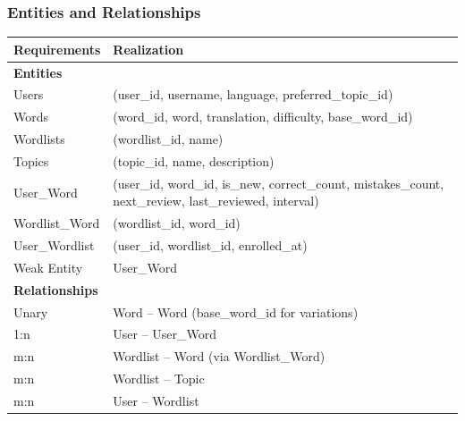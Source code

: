 \documentclass[a4paper, 11pt]{article}
\begin{document}
\subsubsection{Entities and Relationships}
\begin{table}[H]
\begin{tabular}{|l|l|}
\hline
\rowcolor[HTML]{93C47D}  
\textbf{Requirements} & \textbf{Realization} \\ \hline

\rowcolor[HTML]{D9D9D9}
\textbf{Entities} & \\ \hline

\cellcolor[HTML]{D9D9D9} Users & (user\_id, username, language, preferred\_topic\_id) \\ \hline
\cellcolor[HTML]{D9D9D9} Words & (word\_id, word, translation, difficulty, base\_word\_id) \\ \hline
\cellcolor[HTML]{D9D9D9} Wordlists & (wordlist\_id, name) \\ \hline
\cellcolor[HTML]{D9D9D9} Topics & (topic\_id, name, description) \\ \hline
\cellcolor[HTML]{D9D9D9} User\_Word & (user\_id, word\_id, is\_new, correct\_count, mistakes\_count, next\_review, last\_reviewed, interval) \\ \hline
\cellcolor[HTML]{D9D9D9} Wordlist\_Word & (wordlist\_id, word\_id) \\ \hline
\cellcolor[HTML]{D9D9D9} User\_Wordlist & (user\_id, wordlist\_id, enrolled\_at) \\ \hline
\cellcolor[HTML]{D9D9D9} Weak Entity & User\_Word \\ \hline

\rowcolor[HTML]{D9D9D9}
\textbf{Relationships} & \\ \hline

\cellcolor[HTML]{D9D9D9} Unary & Word -- Word (base\_word\_id for variations) \\ \hline
\cellcolor[HTML]{D9D9D9} 1:n & User -- User\_Word \\ \hline
\cellcolor[HTML]{D9D9D9} m:n & Wordlist -- Word (via Wordlist\_Word) \\ \hline
\cellcolor[HTML]{D9D9D9} m:n & Wordlist -- Topic \\ \hline
\cellcolor[HTML]{D9D9D9} m:n & User -- Wordlist \\ \hline

\end{tabular}
\end{table}

\clearpage
\end{document}
